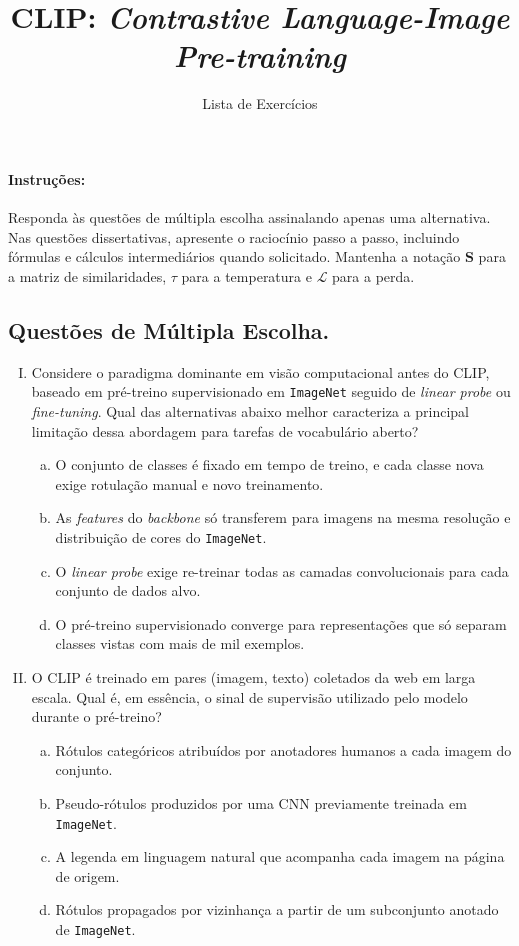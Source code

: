 \documentclass{dlproblemset}
\title{CLIP: \textit{Contrastive Language-Image Pre-training}}
\subtitle{Lista de Exercícios}
\begin{document}
\paragraph{Instruções:} Responda às questões de múltipla escolha assinalando apenas uma alternativa. Nas questões dissertativas, apresente o raciocínio passo a passo, incluindo fórmulas e cálculos intermediários quando solicitado. Mantenha a notação $\mathbf{S}$ para a matriz de similaridades, $\tau$ para a temperatura e $\mathcal{L}$ para a perda.

\subsection*{Questões de Múltipla Escolha.}

\begin{enumerate}[I)]

    \item Considere o paradigma dominante em visão computacional antes do CLIP, baseado em pré-treino supervisionado em \texttt{ImageNet} seguido de \textit{linear probe} ou \textit{fine-tuning}. Qual das alternativas abaixo melhor caracteriza a principal limitação dessa abordagem para tarefas de vocabulário aberto?
    \begin{enumerate}[(a)]
        \item O conjunto de classes é fixado em tempo de treino, e cada classe nova exige rotulação manual e novo treinamento.
        \item As \textit{features} do \textit{backbone} só transferem para imagens na mesma resolução e distribuição de cores do \texttt{ImageNet}.
        \item O \textit{linear probe} exige re-treinar todas as camadas convolucionais para cada conjunto de dados alvo.
        \item O pré-treino supervisionado converge para representações que só separam classes vistas com mais de mil exemplos.
    \end{enumerate}

    \item O CLIP é treinado em pares (imagem, texto) coletados da web em larga escala. Qual é, em essência, o sinal de supervisão utilizado pelo modelo durante o pré-treino?
    \begin{enumerate}[(a)]
        \item Rótulos categóricos atribuídos por anotadores humanos a cada imagem do conjunto.
        \item Pseudo-rótulos produzidos por uma CNN previamente treinada em \texttt{ImageNet}.
        \item A legenda em linguagem natural que acompanha cada imagem na página de origem.
        \item Rótulos propagados por vizinhança a partir de um subconjunto anotado de \texttt{ImageNet}.
    \end{enumerate}


\end{enumerate}
\end{document}
